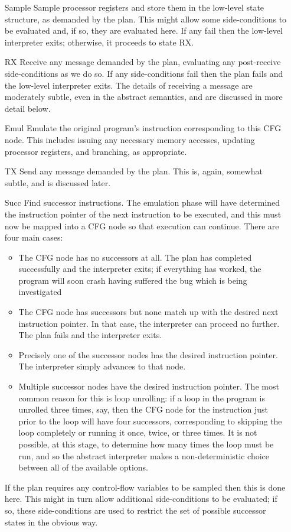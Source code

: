 \begin{itemize}
\item[Sample] Sample processor registers and store them in the
  low-level state structure, as demanded by the plan.  This might
  allow some side-conditions to be evaluated and, if so, they are
  evaluated here.  If any fail then the low-level interpreter
  exits; otherwise, it proceeds to state RX.
\item[RX] Receive any message demanded by the plan, evaluating any
  post-receive side-conditions as we do so.  If any side-conditions
  fail then the plan fails and the low-level interpreter exits.  The
  details of receiving a message are moderately subtle, even in the
  abstract semantics, and are discussed in more detail below.
\item[Emul] Emulate the original program's instruction corresponding
  to this CFG node.  This includes issuing any necessary memory
  accesses, updating processor registers, and branching, as
  appropriate.
\item[TX] Send any message demanded by the plan.  This is, again,
  somewhat subtle, and is discussed later.
\item[Succ] Find successor instructions.  The emulation phase will
  have determined the instruction pointer of the next instruction to
  be executed, and this must now be mapped into a CFG node so that
  execution can continue.  There are four main cases:

  \begin{itemize}
  \item
    The CFG node has no successors at all.  The plan has completed
    successfully and the interpreter exits; if everything has worked,
    the program will soon crash having suffered the bug which is being
    investigated
  \item
    The CFG node has successors but none match up with the desired
    next instruction pointer.  In that case, the interpreter can
    proceed no further.  The plan fails and the interpreter exits.
  \item
    Precisely one of the successor nodes has the desired instruction
    pointer.  The interpreter simply advances to that node.
  \item
    Multiple successor nodes have the desired instruction pointer.
    The most common reason for this is loop unrolling: if a loop in
    the program is unrolled three times, say, then the CFG node for
    the instruction just prior to the loop will have four successors,
    corresponding to skipping the loop completely or running it once,
    twice, or three times.  It is not possible, at this stage, to
    determine how many times the loop must be run, and so the abstract
    interpreter makes a non-deterministic choice between all of the
    available options.
  \end{itemize}

  If the plan requires any control-flow variables to be sampled then
  this is done here.  This might in turn allow additional
  side-conditions to be evaluated; if so, these side-conditions are
  used to restrict the set of possible successor states in the obvious
  way.
\end{itemize}

